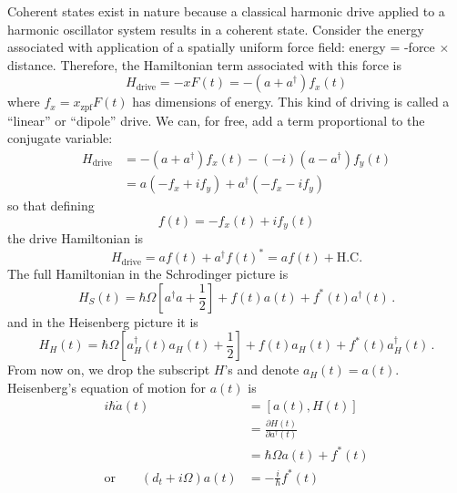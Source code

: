 
Coherent states exist in nature because a classical harmonic drive applied to a harmonic oscillator system results in a coherent state.
Consider the energy associated with application of a spatially uniform force field: energy = -force $\times$ distance.
Therefore, the Hamiltonian term associated with this force is
\begin{equation}
  H_{\textrm{drive}}
  = -x F(t)
  = -(a + a^\dagger) f_x(t)
\end{equation}
where $f_{x} = x_\text{zpf} F(t)$ has dimensions of energy.
This kind of driving is called a ``linear'' or ``dipole'' drive.
We can, for free, add a term proportional to the conjugate variable:
\begin{align*}
  H_{\textrm{drive}}
  &=  -(a+a^{\dagger})f_{x}(t)-(-i)(a-a^{\dagger})f_{y}(t)\\
  &= a(-f_{x}+if_{y})+a^{\dagger}(-f_{x}-if_{y})
\end{align*}
so that defining
\begin{equation}
  f(t) = -f_x(t) + i f_y(t)
\end{equation}
the drive Hamiltonian is
\begin{equation*}
  H_{\textrm{drive}} = af(t)+a^{\dagger}f(t)^{*} = af(t)+\textrm{H.C.}
\end{equation*}
The full Hamiltonian in the Schrodinger picture is
\begin{equation}
  H_S(t)
  = \hbar\Omega\left[a^{\dagger} a + \frac{1}{2} \right] + f(t) a(t) + f^*(t) a^\dagger(t)
  \, .
\end{equation}
and in the Heisenberg picture it is
\begin{equation}
  H_H(t)
  = \hbar\Omega\left[a_H^{\dagger}(t)a_H(t) + \frac{1}{2}\right] + f(t)a_H(t) + f^{*}(t)a_H^{\dagger}(t)
  \, .
\end{equation}
From now on, we drop the subscript $H$'s and denote $a_H(t) = a(t)$.
Heisenberg's equation of motion for $a(t)$ is
\begin{align*}
  i\hbar\dot{a}(t)
  &= \left[ a(t), H(t) \right] \\
  &= \frac{\partial H(t)}{\partial a^{\dagger}(t)} \\
  &= \hbar\Omega a(t) + f^{*}(t) \\
  \textrm{or} \qquad
  \left(d_{t}+i\Omega\right)a(t) &= -\frac{i}{\hbar}f^{*}(t)
\end{align*}


